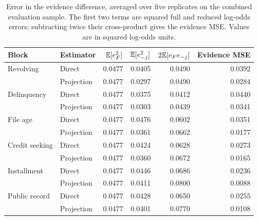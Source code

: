 \begin{table}[t]\centering\small
\caption{Error in the evidence difference, averaged over five replicates on the combined evaluation sample. The first two terms are squared full and reduced log-odds errors; subtracting twice their cross-product gives the evidence MSE. Values are in squared log-odds units.}
\label{tab:error_decomposition}
\begin{tabular}{@{}llrrrr@{}}\toprule
Block & Estimator & $\mathbb E[e_F^2]$ & $\mathbb E[e_{-j}^2]$ & $2\mathbb E[e_Fe_{-j}]$ & Evidence MSE\\\midrule
Revolving & Direct & 0.0477 & 0.0405 & 0.0490 & 0.0392\\
 & Projection & 0.0477 & 0.0297 & 0.0490 & 0.0284\\
Delinquency & Direct & 0.0477 & 0.0375 & 0.0412 & 0.0440\\
 & Projection & 0.0477 & 0.0303 & 0.0439 & 0.0341\\
File age & Direct & 0.0477 & 0.0476 & 0.0602 & 0.0351\\
 & Projection & 0.0477 & 0.0361 & 0.0662 & 0.0177\\
Credit seeking & Direct & 0.0477 & 0.0424 & 0.0628 & 0.0273\\
 & Projection & 0.0477 & 0.0360 & 0.0672 & 0.0165\\
Installment & Direct & 0.0477 & 0.0446 & 0.0686 & 0.0236\\
 & Projection & 0.0477 & 0.0411 & 0.0800 & 0.0088\\
Public record & Direct & 0.0477 & 0.0428 & 0.0650 & 0.0255\\
 & Projection & 0.0477 & 0.0401 & 0.0770 & 0.0108\\
\bottomrule\end{tabular}
\end{table}
